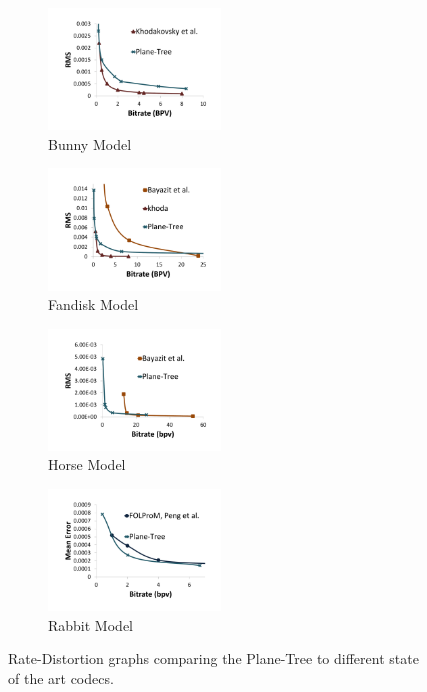 \begin{figure}[!htb] 
        \centering
        \begin{subfigure}[b]{1.8in}
                \includegraphics[width=1.8in]{images/results/compression/bunnysota}
                \caption{Bunny Model}
                \label{fig:SA_BUNNY}
        \end{subfigure}%
        \begin{subfigure}[b]{1.8in}
                \includegraphics[width=1.8in]{images/results/compression/fandisksota}
                \caption{Fandisk Model}
                \label{fig:SA_FANDISK}
        \end{subfigure}
        
        \begin{subfigure}[b]{1.8in}
                \includegraphics[width=1.8in]{images/results/compression/horsesota}
                \caption{Horse Model}
                \label{fig:SA_HORSE}
        \end{subfigure}%
        \begin{subfigure}[b]{1.8in}
                \includegraphics[width=1.8in]{images/results/compression/rabbitsota}
                \caption{Rabbit Model}
                \label{fig:SA_RABBIT}
        \end{subfigure}
       \caption{Rate-Distortion graphs comparing the Plane-Tree to different state of the art codecs.}
       \label{fig:SOTAEXPS}
\end{figure}

